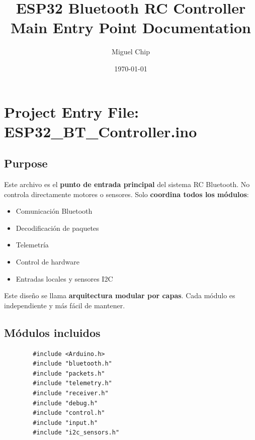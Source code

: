 \documentclass[12pt,a4paper]{article}
\title{ESP32 Bluetooth RC Controller\\Main Entry Point Documentation}
\author{Miguel Chip}
\date{\today}
\begin{document}
\maketitle
\tableofcontents
\newpage
\setlength{\parskip}{6pt}
\setlength{\parindent}{0pt}
\setlength{\tabcolsep}{12pt}
\renewcommand{\arraystretch}{1.5}

\section{Project Entry File: ESP32\_BT\_Controller.ino}

\subsection{Purpose}
Este archivo es el \textbf{punto de entrada principal} del sistema RC Bluetooth.
No controla directamente motores o sensores.
Solo \textbf{coordina todos los módulos}:

\begin{itemize}
	\item Comunicación Bluetooth
	\item Decodificación de paquetes
	\item Telemetría
	\item Control de hardware
	\item Entradas locales y sensores I2C
\end{itemize}

Este diseño se llama \textbf{arquitectura modular por capas}.
Cada módulo es independiente y más fácil de mantener.

\subsection{Módulos incluidos}
\begin{lstlisting}
		#include <Arduino.h>
		#include "bluetooth.h"
		#include "packets.h"
		#include "telemetry.h"
		#include "receiver.h"
		#include "debug.h"
		#include "control.h"
		#include "input.h"
		#include "i2c_sensors.h"
	\end{lstlisting}
\end{document}
